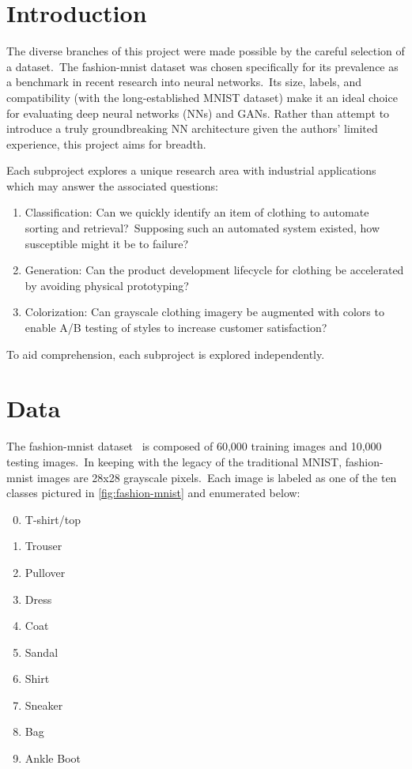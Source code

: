 \documentclass[conference]{IEEEtran}
\begin{document}
    \section{Introduction}\label{sec:introduction}

    The diverse branches of this project were made possible by the careful selection of a dataset.\ The fashion-mnist dataset was chosen specifically for its prevalence as a benchmark in recent research into neural networks.\ Its size, labels, and compatibility (with the long-established MNIST dataset) make it an ideal choice for evaluating deep neural networks (NNs) and GANs. Rather than attempt to introduce a truly groundbreaking NN architecture given the authors' limited experience, this project aims for breadth.

    Each subproject explores a unique research area with industrial applications which may answer the associated questions:

    \begin{enumerate}
        \item Classification: Can we quickly identify an item of clothing to automate sorting and retrieval?\ Supposing such an automated system existed, how susceptible might it be to failure?
        \item Generation: Can the product development lifecycle for clothing be accelerated by avoiding physical prototyping?
        \item Colorization: Can grayscale clothing imagery be augmented with colors to enable A/B testing of styles to increase customer satisfaction?
    \end{enumerate}

    To aid comprehension, each subproject is explored independently.

    \section{Data}\label{sec:data}

    The fashion-mnist dataset~\cite{xiao2017/online} is composed of 60,000 training images and 10,000 testing images.\ In keeping with the legacy of the traditional MNIST, fashion-mnist images are 28x28 grayscale pixels.\ Each image is labeled as one of the ten classes pictured in \autoref{fig:fashion-mnist} and enumerated below:

    \begin{enumerate}
        \setcounter{enumi}{-1}
        \item T-shirt/top
        \item Trouser
        \item Pullover
        \item Dress
        \item Coat
        \item Sandal
        \item Shirt
        \item Sneaker
        \item Bag
        \item Ankle Boot
    \end{enumerate}
\end{document}
